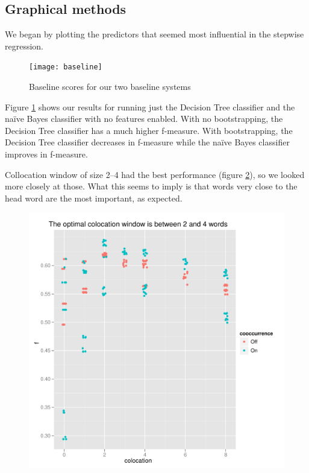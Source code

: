 \documentclass{article}
\newcommand{\naive}{na\"ive}
\begin{document}
\subsection{Graphical methods}
We began by plotting the predictors that seemed most influential in the
stepwise regression.

\begin{figure}[h]
\texttt{[image: baseline]}
\caption{\label{fig:base}Baseline scores for our two baseline systems}
\end{figure}

Figure \ref{fig:base} shows our results for running just the Decision
Tree classifier and the \naive{} Bayes classifier with no features
enabled. With no bootstrapping, the Decision Tree classifier has a
much higher f-measure. With bootstrapping, the Decision Tree
classifier decreases in f-measure while the \naive{} Bayes classifier
improves in f-measure.

Collocation window of size 2--4 had the best performance (figure
\ref{fig2}), so we looked more closely at those. What this seems to
imply is that words very close to the head word are the most
important, as expected.

\begin{figure}[h]
\includegraphics[width=\textwidth]{pg_0002}
\caption{\label{fig2}}
\end{figure}
\end{document}
